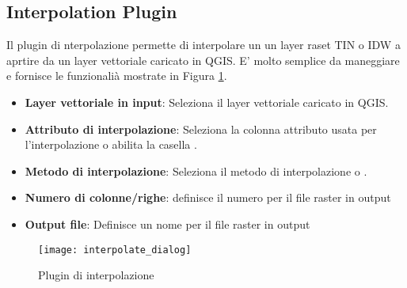 
\subsection{Interpolation Plugin}


Il plugin di nterpolazione permette di interpolare un un layer raset TIN o IDW a aprtire da un layer vettoriale caricato in QGIS. E' molto semplice da maneggiare e fornisce le funzionalià mostrate in Figura \ref{fig:interpolation_dialog}.

\begin{itemize}
\item \textbf{Layer vettoriale in input}: Seleziona il layer vettoriale caricato in QGIS.
\item \textbf{Attributo di interpolazione}: Seleziona la colonna attributo usata per l'interpolazione o abilita la casella .
\item \textbf{Metodo di interpolazione}: Seleziona il metodo di interpolazione  o .
\item \textbf{Numero di colonne/righe}: definisce il numero per il file raster in output
\item \textbf{Output file}: Definisce un nome per il file raster in output
\end{itemize}

\begin{figure}[ht]
   \begin{center}
   \caption{Plugin di interpolazione\nixcaption}\label{fig:interpolation_dialog}\smallskip
   \texttt{[image: interpolate\_dialog]}
\end{center}  
\end{figure}

